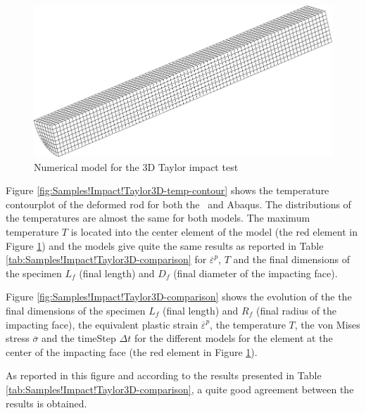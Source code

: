 \begin{figure}[h]
\begin{centering}
\includegraphics[width=0.5\columnwidth]{Figures/Samples/Impact/Taylor-3D_mesh}
\par\end{centering}
\caption{Numerical model for the 3D Taylor impact test\label{fig:Samples!Impact!Taylor3D}}
\end{figure}

Figure \ref{fig:Samples!Impact!Taylor3D-temp-contour} shows the temperature
contourplot of the deformed rod for both the \DynELA~and Abaqus.
The distributions of the temperatures are almost the same for both
models. The maximum temperature $T$ is located into the center element
of the model (the red element in Figure \ref{fig:Samples!Impact!Taylor3D})
and the models give quite the same results as reported in Table \ref{tab:Samples!Impact!Taylor3D-comparison}
for $\overline{\varepsilon}^{p}$, $T$ and the final dimensions of
the specimen $L_{f}$ (final length) and $D_{f}$ (final diameter
of the impacting face). 

Figure \ref{fig:Samples!Impact!Taylor3D-comparison} shows the evolution
of the the final dimensions of the specimen $L_{f}$ (final length)
and $R_{f}$ (final radius of the impacting face), the equivalent
plastic strain $\overline{\varepsilon}^{p}$, the temperature $T$,
the von Mises stress $\overline{\sigma}$ and the timeStep $\Delta t$
for the different models for the element at the center of the impacting
face (the red element in Figure \ref{fig:Samples!Impact!Taylor3D}). 

As reported in this figure and according to the results presented
in Table \ref{tab:Samples!Impact!Taylor3D-comparison}, a quite good
agreement between the results is obtained.

